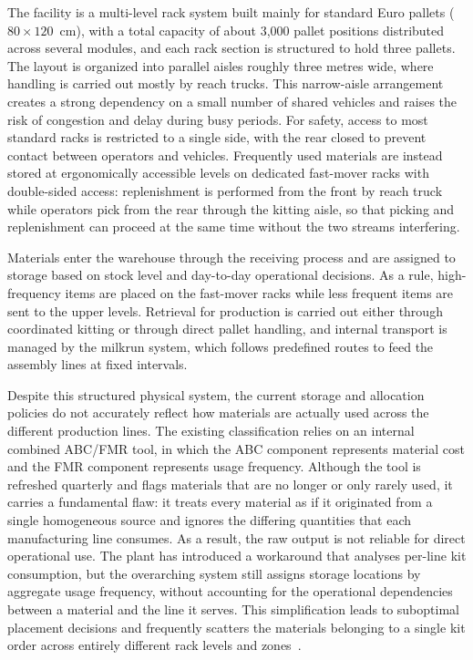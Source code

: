 \documentclass[12pt,a4paper]{article}
\begin{document}
The facility is a multi-level rack system built mainly for standard Euro
pallets ($80 \times 120$~cm), with a total capacity of about 3{,}000 pallet
positions distributed across several modules, and each rack section is
structured to hold three pallets. The layout is organized into parallel aisles
roughly three metres wide, where handling is carried out mostly by reach
trucks. This narrow-aisle arrangement creates a strong dependency on a small
number of shared vehicles and raises the risk of congestion and delay during
busy periods. For safety, access to most standard racks is restricted to a
single side, with the rear closed to prevent contact between operators and
vehicles. Frequently used materials are instead stored at ergonomically
accessible levels on dedicated fast-mover racks with double-sided access:
replenishment is performed from the front by reach truck while operators pick
from the rear through the kitting aisle, so that picking and replenishment can
proceed at the same time without the two streams interfering.

Materials enter the warehouse through the receiving process and are assigned
to storage based on stock level and day-to-day operational decisions. As a
rule, high-frequency items are placed on the fast-mover racks while less
frequent items are sent to the upper levels. Retrieval for production is
carried out either through coordinated kitting or through direct pallet
handling, and internal transport is managed by the milkrun system, which
follows predefined routes to feed the assembly lines at fixed intervals.

Despite this structured physical system, the current storage and allocation
policies do not accurately reflect how materials are actually used across the
different production lines. The existing classification relies on an internal
combined ABC/FMR tool, in which the ABC component represents material cost and
the FMR component represents usage frequency. Although the tool is refreshed
quarterly and flags materials that are no longer or only rarely used, it
carries a fundamental flaw: it treats every material as if it originated from
a single homogeneous source and ignores the differing quantities that each
manufacturing line consumes. As a result, the raw output is not reliable for
direct operational use. The plant has introduced a workaround that analyses
per-line kit consumption, but the overarching system still assigns storage
locations by aggregate usage frequency, without accounting for the operational
dependencies between a material and the line it serves. This simplification
leads to suboptimal placement decisions and frequently scatters the materials
belonging to a single kit order across entirely different rack levels and
zones~\cite{emde2012,limere2012}.
\end{document}
